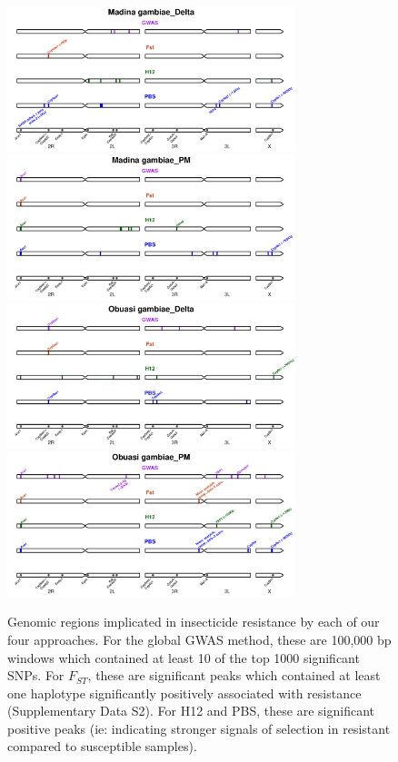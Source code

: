 \documentclass[a4paper,12pt]{article}
\begin{document}
\begin{figure}[h]
	\vskip 0.4cm
	\hspace{-0.3cm}\includegraphics*[width = 8.4cm]{../supplementary_implicated_regions/Madina_gambiae_Delta_implicated_regions.pdf}
	\hspace{-0.3cm}\includegraphics*[width = 8.4cm]{../supplementary_implicated_regions/Madina_gambiae_PM_implicated_regions.pdf}
	\vskip 0.4cm
	\hspace{-0.3cm}\includegraphics*[width = 8.4cm]{../supplementary_implicated_regions/Obuasi_gambiae_Delta_implicated_regions.pdf}
	\hspace{-0.3cm}\includegraphics*[width = 8.4cm]{../supplementary_implicated_regions/Obuasi_gambiae_PM_implicated_regions.pdf}
	\caption{\footnotesize Genomic regions implicated in insecticide resistance by each of our four approaches. For the global GWAS method, these are 100,000 bp windows which contained at least 10 of the top 1000 significant SNPs. For $F_{ST}$, these are significant peaks which contained at least one haplotype significantly positively associated with resistance (Supplementary Data S2). For H12 and PBS, these are significant positive peaks (ie: indicating stronger signals of selection in resistant compared to susceptible samples).}
	\label{FigS5}
\end{figure}
\end{document}
